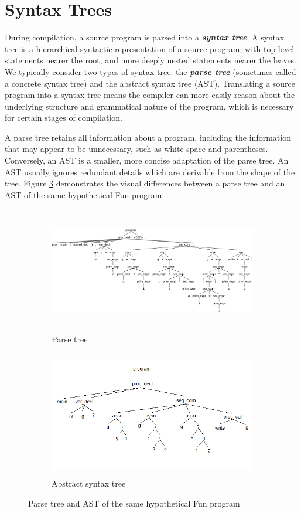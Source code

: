 \documentclass{l4proj}
\begin{document}
\section{Syntax Trees}
During compilation, a source program is parsed into a \textit{\textbf{syntax tree}}. A syntax tree is a hierarchical syntactic representation of a source program; with top-level statements nearer the root, and more deeply nested statements nearer the leaves. We typically consider two types of syntax tree: the \textit{\textbf{parse tree}} (sometimes called a concrete syntax tree) and the abstract syntax tree (AST). Translating a source program into a syntax tree means the compiler can more easily reason about the underlying structure and grammatical nature of the program, which is necessary for certain stages of compilation.

A parse tree retains all information about a program, including the information that may appear to be unnecessary, such as white-space and parentheses. Conversely, an AST is a smaller, more concise adaptation of the parse tree. An AST usually ignores redundant details which are derivable from the shape of the tree. Figure \ref{fig:parse-abstract-tree} demonstrates the visual differences between a parse tree and an AST of the same hypothetical Fun program. 

\begin{figure}[h]
	\begin{subfigure}[b]{0.5\textwidth}
		\includegraphics[height=5.5cm,width=\linewidth]{images/2-2a.png}
		\caption{Parse tree}
		\label{fig:ANTLR-parse-tree}
	\end{subfigure}
	\begin{subfigure}[b]{0.5\textwidth}
		\includegraphics[height=5.5cm,width=\linewidth]{images/2-2b.png}
		\caption{Abstract syntax tree}
		\label{fig:ANTLR-syntax-tree}
	\end{subfigure}
	\caption{Parse tree and AST of the same hypothetical Fun program}\label{fig:parse-abstract-tree}	
\end{figure}
\end{document}

